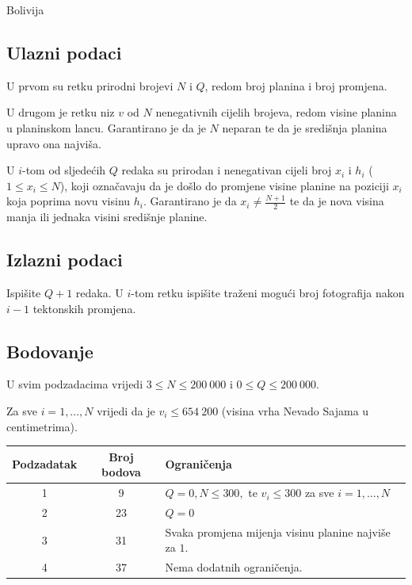 \begin{statement}[
  problempoints=100,
  timelimit=2 sekunde,
  memorylimit=512 MiB,
]{Bolivija}
\subsection*{Ulazni podaci}

U prvom su retku prirodni brojevi $N$ i $Q$, redom broj planina i broj promjena.

U drugom je retku niz $v$ od $N$ nenegativnih cijelih brojeva, redom visine planina u planinskom lancu. 
Garantirano je da je $N$ neparan te da je središnja planina upravo ona najviša. 

U $i$-tom od sljedećih $Q$ redaka su prirodan i nenegativan cijeli broj $x_i$ i $h_i$ ($1 \leq x_i \leq N$), 
koji označavaju da je došlo do promjene visine planine na poziciji $x_i$ koja poprima 
novu visinu $h_i$. Garantirano je da $x_i \ne \frac{N+1}{2}$ te da je nova visina manja 
ili jednaka visini središnje planine. 

\subsection*{Izlazni podaci}

Ispišite $Q + 1$ redaka. U $i$-tom retku ispišite traženi mogući broj fotografija 
nakon $i - 1$ tektonskih promjena. 

\subsection*{Bodovanje}

U svim podzadacima vrijedi $3 \leq N \leq 200~000$ i $0 \leq Q \leq 200~000$. 

Za sve $i = 1, \dots, N$ vrijedi da je $v_i \leq 654~200$ 
(visina vrha Nevado Sajama u centimetrima). 

{\renewcommand{\arraystretch}{1.4}
  \setlength{\tabcolsep}{6pt}
  \begin{tabular}{ccl}
   Podzadatak & Broj bodova & Ograničenja \\ \midrule
    1 & 9 & $Q = 0, N \leq 300,$ te $v_i \leq 300$ za sve $i = 1, \dots, N$ \\
    2 & 23 & $Q = 0$ \\
    3 & 31 & Svaka promjena mijenja visinu planine najviše za $1$.  \\
    4 & 37 & Nema dodatnih ograničenja. \\
\end{tabular}}


\end{statement}
